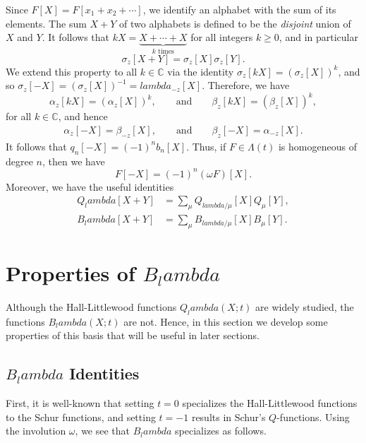 \documentclass[12pt]{amsart}%
\def\lambda{lambda}%
\theoremstyle{remark}
\theoremstyle{definition}
\newcommand{\C}{\mathbb{C}}
\begin{document}
    Since $F[X]=F[x_1+x_2+\cdots]$, we identify an alphabet with the sum of its elements. The sum $X+Y$ of two alphabets is defined to be the \emph{disjoint} union of $X$ and $Y$. It follows that $kX=\underbrace{X+\cdots+X}_{k\text{ times}}$ for all integers $k\geq0$, and in particular
    \[\sigma_z[X+Y]=\sigma_z[X]\sigma_z[Y].\]
    We extend this property to all $k\in\C$ via the identity $\sigma_z[kX]=(\sigma_z[X])^k$, and so $\sigma_z[-X]=(\sigma_z[X])^{-1}=\lambda_{-z}[X]$. Therefore, we have
    \begin{equation*}
        \alpha_z[kX]=(\alpha_z[X])^k,\qquad\text{and}\qquad\beta_z[kX]=(\beta_z[X])^k,
    \end{equation*}
    for all $k\in\C$, and hence
    \begin{align*}
        \alpha_z[-X]=\beta_{-z}[X],\qquad\text{and}\qquad\beta_z[-X]=\alpha_{-z}[X].
    \end{align*}
    It follows that $q_n[-X]=(-1)^nb_n[X]$. Thus, if $F\in\Lambda(t)$ is homogeneous of degree $n$, then we have
    \begin{equation*}
        F[-X]=(-1)^n(\omega F)[X].
    \end{equation*}
    Moreover, we have the useful identities \cite[p.~228]{macdonald:1995}
    \begin{align*}
        Q_\lambda[X+Y]&=\sum_{\mu}Q_{\lambda/\mu}[X]Q_\mu[Y],\\
        B_\lambda[X+Y]&=\sum_{\mu}B_{\lambda/\mu}[X]B_\mu[Y].
    \end{align*}
    

    \section{Properties of $B_\lambda$}

    Although the Hall-Littlewood functions $Q_\lambda(X;t)$ are widely studied, the functions $B_\lambda(X;t)$ are not. Hence, in this section we develop some properties of this basis that will be useful in later sections.

    \subsection{$B_\lambda$ Identities}
    
    First, it is well-known that setting $t=0$ specializes the Hall-Littlewood functions to the Schur functions, and setting $t=-1$ results in Schur's $Q$-functions. Using the involution $\omega$, we see that $B_\lambda$ specializes as follows.
    
\end{document}
